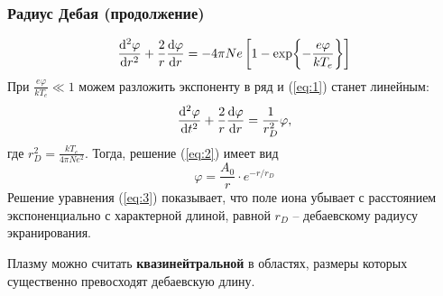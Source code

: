 \documentclass[10pt,pdf,hyperref={unicode}, dvipsnames]{beamer}
\renewcommand{\phi}{\varphi}
\begin{document}
\begin{frame}[t]\frametitle{Радиус Дебая (продолжение)}
	\begin{equation}
	\label{eq:1}
	\dv[2]{\phi}{r}+\frac2r\dv{\phi}{r}=-4\pi Ne\left[1 -
	\exp{-\frac{e\phi}{kT_e}}\right]
\end{equation}
При $\displaystyle \frac{e\phi}{kT_e}\ll1$ можем разложить экспоненту в ряд и (\ref{eq:1}) станет линейным:
\begin{equation}
	\label{eq:2}
	\dv[2]{\phi}{t}+\frac2r\dv{\phi}{r}=\frac{1}{r_D^2}\phi,
\end{equation}
где $\displaystyle r_D^2=\frac{kT_e}{4\pi Ne^2}$.
	Тогда, решение (\ref{eq:2}) имеет вид 
	\begin{equation}
		\label{eq:3}
		\phi=\frac{A_0}{r}\cdot e^{-r/r_D}
	\end{equation}  
    Решение уравнения (\ref{eq:3}) показывает, что поле иона убывает с расстоянием экспоненциально с характерной длиной, равной $r_D$ -- дебаевскому радиусу экранирования. 

    \vfill
    Плазму можно считать  \textbf{квазинейтральной} в областях, размеры которых существенно превосходят дебаевскую длину.
\end{frame}
\end{document}
